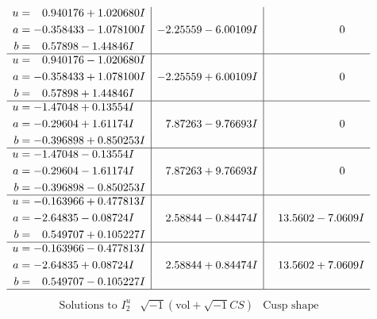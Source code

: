 \documentclass[1p]{elsarticle_modified}
\theoremstyle{definition}
\newcommand{\I}{\sqrt{-1}}
\begin{document}
$$\begin{array}{c|c|c}
\begin{aligned}
u &= \phantom{-}0.940176 + 1.020680 I \\
a &= -0.358433 - 1.078100 I \\
b &= \phantom{-}0.57898 - 1.44846 I\end{aligned}
 & -2.25559 - 6.00109 I & \phantom{-0.000000 } 0 \\ \hline\begin{aligned}
u &= \phantom{-}0.940176 - 1.020680 I \\
a &= -0.358433 + 1.078100 I \\
b &= \phantom{-}0.57898 + 1.44846 I\end{aligned}
 & -2.25559 + 6.00109 I & \phantom{-0.000000 } 0 \\ \hline\begin{aligned}
u &= -1.47048 + 0.13554 I \\
a &= -0.29604 + 1.61174 I \\
b &= -0.396898 + 0.850253 I\end{aligned}
 & \phantom{-}7.87263 - 9.76693 I & \phantom{-0.000000 } 0 \\ \hline\begin{aligned}
u &= -1.47048 - 0.13554 I \\
a &= -0.29604 - 1.61174 I \\
b &= -0.396898 - 0.850253 I\end{aligned}
 & \phantom{-}7.87263 + 9.76693 I & \phantom{-0.000000 } 0 \\ \hline\begin{aligned}
u &= -0.163966 + 0.477813 I \\
a &= -2.64835 - 0.08724 I \\
b &= \phantom{-}0.549707 + 0.105227 I\end{aligned}
 & \phantom{-}2.58844 - 0.84474 I & \phantom{-}13.5602 - 7.0609 I \\ \hline\begin{aligned}
u &= -0.163966 - 0.477813 I \\
a &= -2.64835 + 0.08724 I \\
b &= \phantom{-}0.549707 - 0.105227 I\end{aligned}
 & \phantom{-}2.58844 + 0.84474 I & \phantom{-}13.5602 + 7.0609 I\\
 \hline 
 \end{array}$$\newpage$$\begin{array}{c|c|c}  
\text{Solutions to }I^u_{2}& \I (\text{vol} + \sqrt{-1}CS) & \text{Cusp shape}\\
 \hline 
\begin{aligned}

\end{aligned}
\end{array}$$
\end{document}
